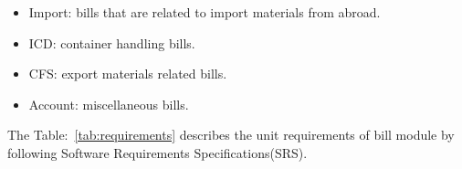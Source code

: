 \documentclass[12pt]{article}
\begin{document}
\begin{itemize}
	
    \item Import: bills that are related to import materials from abroad.
    
    \item ICD: container handling bills.
    
    \item CFS: export materials related bills.
    
    \item Account: miscellaneous bills. 

\end{itemize}

The Table:~\ref{tab:requirements} describes the unit requirements of bill module by following Software Requirements Specifications(SRS)\cite{SRS:2010}. \\
\end{document}
